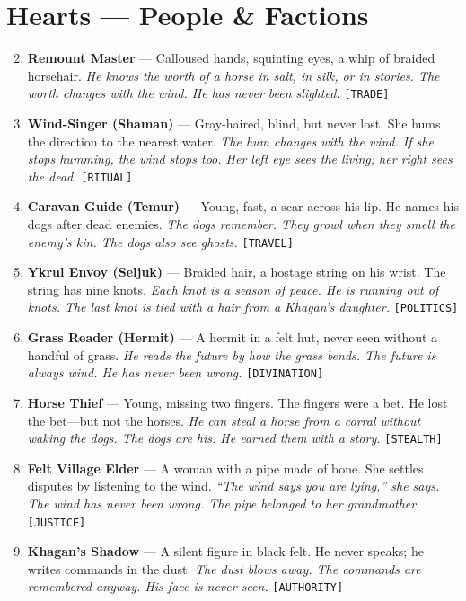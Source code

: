 \section*{Hearts --- People \& Factions}
\label{sec:kuvani-people}
\begin{enumerate}
\setcounter{enumi}{1}
\item \textbf{Remount Master} --- Calloused hands, squinting eyes, a whip of braided horsehair.
  \hfill \textit{He knows the worth of a horse in salt, in silk, or in stories. The worth changes with the wind. He has never been slighted.} \texttt{[TRADE]}
\item \textbf{Wind-Singer (Shaman)} --- Gray-haired, blind, but never lost. She hums the direction to the nearest water.
  \hfill \textit{The hum changes with the wind. If she stops humming, the wind stops too. Her left eye sees the living; her right sees the dead.} \texttt{[RITUAL]}
\item \textbf{Caravan Guide (Temur)} --- Young, fast, a scar across his lip. He names his dogs after dead enemies.
  \hfill \textit{The dogs remember. They growl when they smell the enemy's kin. The dogs also see ghosts.} \texttt{[TRAVEL]}
\item \textbf{Ykrul Envoy (Seljuk)} --- Braided hair, a hostage string on his wrist. The string has nine knots.
  \hfill \textit{Each knot is a season of peace. He is running out of knots. The last knot is tied with a hair from a Khagan's daughter.} \texttt{[POLITICS]}
\item \textbf{Grass Reader (Hermit)} --- A hermit in a felt hut, never seen without a handful of grass.
  \hfill \textit{He reads the future by how the grass bends. The future is always wind. He has never been wrong.} \texttt{[DIVINATION]}
\item \textbf{Horse Thief} --- Young, missing two fingers. The fingers were a bet. He lost the bet---but not the horses.
  \hfill \textit{He can steal a horse from a corral without waking the dogs. The dogs are his. He earned them with a story.} \texttt{[STEALTH]}
\item \textbf{Felt Village Elder} --- A woman with a pipe made of bone. She settles disputes by listening to the wind.
  \hfill \textit{``The wind says you are lying,'' she says. The wind has never been wrong. The pipe belonged to her grandmother.} \texttt{[JUSTICE]}
\item \textbf{Khagan's Shadow} --- A silent figure in black felt. He never speaks; he writes commands in the dust.
  \hfill \textit{The dust blows away. The commands are remembered anyway. His face is never seen.} \texttt{[AUTHORITY]}

\end{enumerate}
